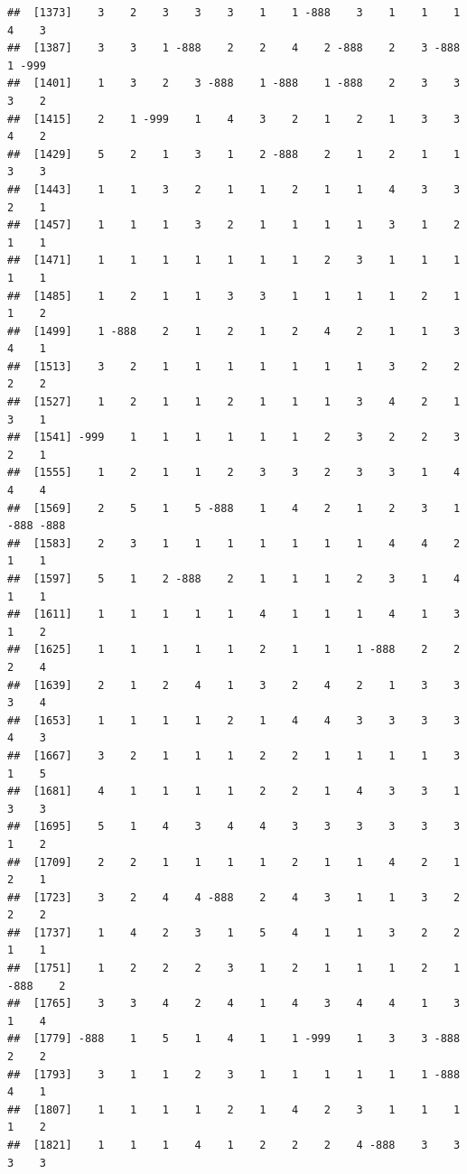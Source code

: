 \documentclass[
  12pt,
  openany]{book}
\begin{document}
\begin{verbatim}
##  [1373]    3    2    3    3    3    1    1 -888    3    1    1    1    4    3
##  [1387]    3    3    1 -888    2    2    4    2 -888    2    3 -888    1 -999
##  [1401]    1    3    2    3 -888    1 -888    1 -888    2    3    3    3    2
##  [1415]    2    1 -999    1    4    3    2    1    2    1    3    3    4    2
##  [1429]    5    2    1    3    1    2 -888    2    1    2    1    1    3    3
##  [1443]    1    1    3    2    1    1    2    1    1    4    3    3    2    1
##  [1457]    1    1    1    3    2    1    1    1    1    3    1    2    1    1
##  [1471]    1    1    1    1    1    1    1    2    3    1    1    1    1    1
##  [1485]    1    2    1    1    3    3    1    1    1    1    2    1    1    2
##  [1499]    1 -888    2    1    2    1    2    4    2    1    1    3    4    1
##  [1513]    3    2    1    1    1    1    1    1    1    3    2    2    2    2
##  [1527]    1    2    1    1    2    1    1    1    3    4    2    1    3    1
##  [1541] -999    1    1    1    1    1    1    2    3    2    2    3    2    1
##  [1555]    1    2    1    1    2    3    3    2    3    3    1    4    4    4
##  [1569]    2    5    1    5 -888    1    4    2    1    2    3    1 -888 -888
##  [1583]    2    3    1    1    1    1    1    1    1    4    4    2    1    1
##  [1597]    5    1    2 -888    2    1    1    1    2    3    1    4    1    1
##  [1611]    1    1    1    1    1    4    1    1    1    4    1    3    1    2
##  [1625]    1    1    1    1    1    2    1    1    1 -888    2    2    2    4
##  [1639]    2    1    2    4    1    3    2    4    2    1    3    3    3    4
##  [1653]    1    1    1    1    2    1    4    4    3    3    3    3    4    3
##  [1667]    3    2    1    1    1    2    2    1    1    1    1    3    1    5
##  [1681]    4    1    1    1    1    2    2    1    4    3    3    1    3    3
##  [1695]    5    1    4    3    4    4    3    3    3    3    3    3    1    2
##  [1709]    2    2    1    1    1    1    2    1    1    4    2    1    2    1
##  [1723]    3    2    4    4 -888    2    4    3    1    1    3    2    2    2
##  [1737]    1    4    2    3    1    5    4    1    1    3    2    2    1    1
##  [1751]    1    2    2    2    3    1    2    1    1    1    2    1 -888    2
##  [1765]    3    3    4    2    4    1    4    3    4    4    1    3    1    4
##  [1779] -888    1    5    1    4    1    1 -999    1    3    3 -888    2    2
##  [1793]    3    1    1    2    3    1    1    1    1    1    1 -888    4    1
##  [1807]    1    1    1    1    2    1    4    2    3    1    1    1    1    2
##  [1821]    1    1    1    4    1    2    2    2    4 -888    3    3    3    3

\end{verbatim}
\end{document}
